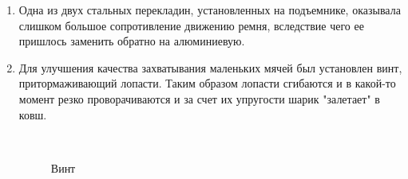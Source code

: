 \begin{enumerate}
	\item Одна из двух стальных перекладин, установленных на подъемнике, оказывала слишком большое сопротивление движению ремня, вследствие чего ее пришлось заменить обратно на алюминиевую.
	
	\item Для улучшения качества захватывания маленьких мячей был установлен винт, притормаживающий лопасти. Таким образом лопасти сгибаются и в какой-то момент резко проворачиваются и за счет их упругости шарик "залетает" в ковш.
	\begin{figure}[H]
		\begin{minipage}[h]{0.2\linewidth}
			\center  
		\end{minipage}
		\begin{minipage}[h]{0.6\linewidth}
			\caption{Винт}
		\end{minipage}
	\end{figure}
	

\end{enumerate}
